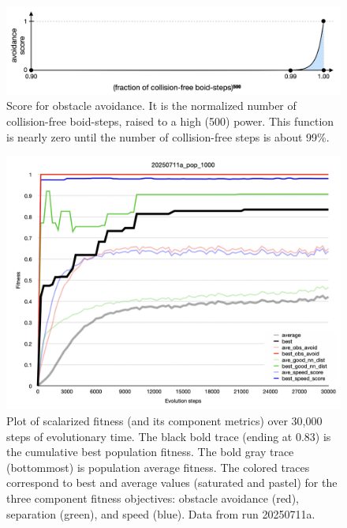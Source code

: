 \documentclass[letterpaper]{article}
\begin{document}


\begin{figure}[]
    \centering
    \includegraphics[width=0.9\linewidth]{images/temp_avoidance_score.png}
    \caption{Score for obstacle avoidance. It is the normalized number of collision-free boid-steps, raised to a high (500) power. This function is nearly zero until the number of collision-free steps is about 99\%.}
    \label{fig:avoid_score}
\end{figure}



\begin{figure}[]
    \centering
    \includegraphics[width=\linewidth]{images/temp_fit_plot.png}
    \caption{Plot of scalarized fitness (and its component metrics) over 30,000 steps of evolutionary time. The black bold trace (ending at 0.83) is the cumulative best population fitness. The bold gray trace (bottommost) is population average fitness. The colored traces correspond to best and average values (saturated and pastel) for the three component fitness objectives: obstacle avoidance (red), separation (green), and speed (blue). Data from run 20250711a.}
    \label{fig:fit_plot}
\end{figure}
\end{document}
